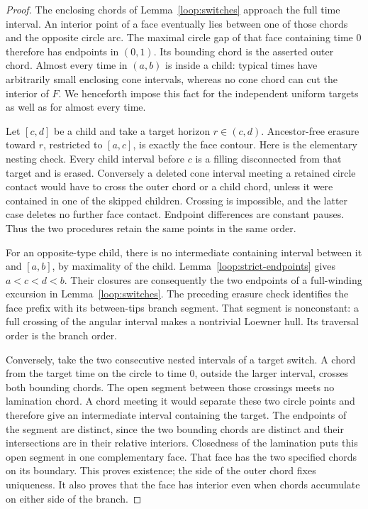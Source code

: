 \documentclass[11pt]{article}
\numberwithin{equation}{section}
\theoremstyle{definition}
\theoremstyle{remark}
\newcommand{\1}{\mathbf 1}
\begin{document}
\begin{proof}
The enclosing chords of Lemma~\ref{loop:switches} approach the full
time interval.  An interior point of a face eventually lies between
one of those chords and the opposite circle arc.  The maximal circle
gap of that face containing time $0$ therefore has endpoints in
$(0,1)$.  Its bounding chord is the asserted outer chord.  Almost every
time in $(a,b)$ is inside a child: typical times have arbitrarily small
enclosing cone intervals, whereas no cone chord can cut the interior
of $F$.  We henceforth impose this fact for the independent uniform
targets as well as for almost every time.

Let $[c,d]$ be a child and take a target horizon $r\in(c,d)$.
Ancestor-free erasure toward $r$, restricted to $[a,c]$, is exactly the
face contour.  Here is the elementary nesting check.  Every child
interval before $c$ is a filling disconnected from that target and is
erased.  Conversely a deleted cone interval meeting a retained circle
contact would have to cross the outer chord or a child chord, unless
it were contained in one of the skipped children.  Crossing is
impossible, and the latter case deletes no further face contact.
Endpoint differences are constant pauses.  Thus the two procedures
retain the same points in the same order.

For an opposite-type child, there is no intermediate containing
interval between it and $[a,b]$, by maximality of the child.
Lemma~\ref{loop:strict-endpoints} gives $a<c<d<b$.  Their
closures are consequently the two endpoints of a full-winding
excursion in Lemma~\ref{loop:switches}.  The preceding erasure check
identifies the face prefix with its between-tips branch segment.  That
segment is nonconstant: a full crossing of the angular interval makes
a nontrivial Loewner hull.  Its traversal order is the branch order.

Conversely, take the two consecutive nested intervals of a target
switch.  A chord from the target time on the circle to time $0$,
outside the larger interval, crosses both bounding chords.  The open
segment between those crossings meets no lamination chord.  A chord
meeting it would separate these two circle points and therefore give
an intermediate interval containing the target.  The endpoints of the
segment are distinct, since the two bounding chords are distinct and
their intersections are in their relative interiors.  Closedness of
the lamination puts this open segment in one complementary face.
That face has the two specified chords on its boundary.  This proves
existence; the side of the outer chord fixes uniqueness.  It also
proves that the face has interior even when chords accumulate on
either side of the branch.


\end{proof}
\end{document}
